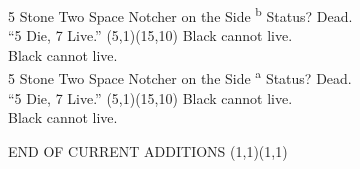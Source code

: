 \documentclass[12pt]{letter}
\begin{document}



\makeflashcardwithboards
  {\Large5 Stone Two Space Notcher on the Side \textsuperscript{b}}
  {Status?}
  {Dead.\\``5 Die, 7 Live.''}
  {(5,1)(15,10)}
  {
       
      
        
       
       
  }
  {Black cannot live.\\\null}
  {   }
  {Black cannot live.\\\null}
  {   }
\makeflashcardwithboards
  {\Large5 Stone Two Space Notcher on the Side \textsuperscript{a}}
  {Status?}
  {Dead.\\``5 Die, 7 Live.''}
  {(5,1)(15,10)}
  {
       
     
        
       
       
  }
  {Black cannot live.\\\null}
  {   }
  {Black cannot live.\\\null}
  {   }

\makeflashcardwithboards {} {END OF CURRENT ADDITIONS} {} {(1,1)(1,1)} {} {} {} {} {}
\end{document}
